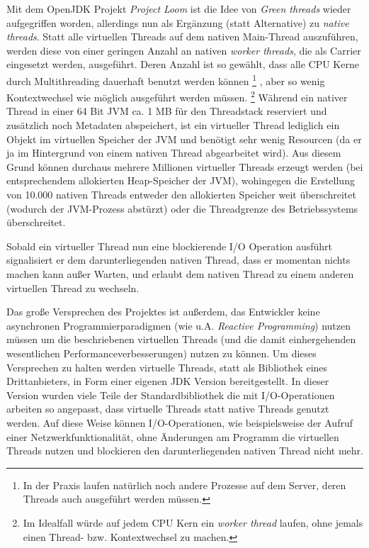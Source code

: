 Mit dem OpenJDK Projekt \textit{Project Loom} ist die Idee von \textit{Green threads}
wieder aufgegriffen worden, allerdings nun als Ergänzung (statt Alternative) zu \textit{native threads}.
Statt alle virtuellen Threads auf dem nativen Main-Thread auszuführen, werden diese von einer geringen Anzahl an nativen \textit{worker threads},
die als Carrier eingesetzt werden, ausgeführt.
Deren Anzahl ist so gewählt, dass alle CPU Kerne durch Multithreading dauerhaft benutzt werden können
\footnote{In der Praxis laufen natürlich noch andere Prozesse auf dem Server, deren Threads auch ausgeführt werden müssen.}
, aber so wenig Kontextwechsel wie möglich ausgeführt werden müssen.
\parencite{Oracle2021} \footnote{Im Idealfall würde auf jedem CPU Kern ein \textit{worker thread} laufen,
    ohne jemals einen Thread- bzw. Kontextwechsel zu machen.}
Während ein nativer Thread in einer 64 Bit JVM ca. 1 MB für den Threadstack reserviert und zusätzlich noch Metadaten abspeichert, ist ein virtueller Thread
lediglich ein Objekt im virtuellen Speicher der JVM und benötigt sehr wenig Resourcen (da er ja im Hintergrund von einem
nativen Thread abgearbeitet wird).
Aus diesem Grund können durchaus mehrere Millionen virtueller Threads erzeugt werden (bei entsprechendem allokierten Heap-Speicher der JVM), wohingegen
die Erstellung von 10.000 nativen Threads entweder den allokierten Speicher weit überschreitet (wodurch der JVM-Prozess abstürzt) oder die Threadgrenze
des Betriebssystems überschreitet.

Sobald ein virtueller Thread nun eine blockierende I/O Operation ausführt signalisiert er dem darunterliegenden nativen Thread, dass er momentan nichts machen
kann außer Warten, und erlaubt dem nativen Thread zu einem anderen virtuellen Thread zu wechseln.

Das große Versprechen des Projektes ist außerdem, das Entwickler keine asynchronen Programmierparadigmen (wie u.A. \textit{Reactive Programming})
nutzen müssen um die beschriebenen virtuellen Threads (und die damit einhergehenden wesentlichen Performanceverbesserungen) nutzen zu können.
Um dieses Versprechen zu halten werden virtuelle Threads, statt als Bibliothek eines Drittanbieters, in Form einer eigenen JDK Version bereitgestellt.
In dieser Version wurden viele Teile der Standardbibliothek die mit I/O-Operationen arbeiten so angepasst, dass virtuelle Threads statt native Threads
genutzt werden. Auf diese Weise können I/O-Operationen, wie beispielsweise der Aufruf einer Netzwerkfunktionalität, ohne Änderungen am Programm
die virtuellen Threads nutzen und blockieren den darunterliegenden nativen Thread nicht mehr.

